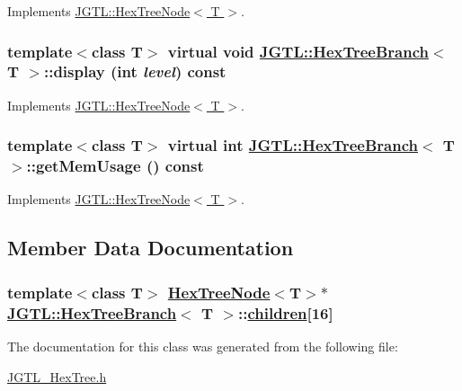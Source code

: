 Implements \hyperlink{class_j_g_t_l_1_1_hex_tree_node_a65570f2ecf17f3537a8a726795b4152}{JGTL::Hex\-Tree\-Node$<$ T $>$}.\hypertarget{class_j_g_t_l_1_1_hex_tree_branch_b9ca243a3f04629750ee65544b14e548}{
\subsubsection[display]{\setlength{\rightskip}{0pt plus 5cm}template$<$class T$>$ virtual void \hyperlink{class_j_g_t_l_1_1_hex_tree_branch}{JGTL::Hex\-Tree\-Branch}$<$ T $>$::display (int {\em level}) const}}
\label{class_j_g_t_l_1_1_hex_tree_branch_b9ca243a3f04629750ee65544b14e548}




Implements \hyperlink{class_j_g_t_l_1_1_hex_tree_node_2031e26f8fbf11d061e51cdd0a6c27eb}{JGTL::Hex\-Tree\-Node$<$ T $>$}.\hypertarget{class_j_g_t_l_1_1_hex_tree_branch_84bea1c135b12ec017dfa3c701d0f9c9}{
\subsubsection[getMemUsage]{\setlength{\rightskip}{0pt plus 5cm}template$<$class T$>$ virtual int \hyperlink{class_j_g_t_l_1_1_hex_tree_branch}{JGTL::Hex\-Tree\-Branch}$<$ T $>$::get\-Mem\-Usage () const}}
\label{class_j_g_t_l_1_1_hex_tree_branch_84bea1c135b12ec017dfa3c701d0f9c9}




Implements \hyperlink{class_j_g_t_l_1_1_hex_tree_node_9d71c1520ef1d80cf8ff292710e1994d}{JGTL::Hex\-Tree\-Node$<$ T $>$}.

\subsection{Member Data Documentation}
\hypertarget{class_j_g_t_l_1_1_hex_tree_branch_9917ee19fc32f342d487cb9d887887da}{
\subsubsection[children]{\setlength{\rightskip}{0pt plus 5cm}template$<$class T$>$ \hyperlink{class_j_g_t_l_1_1_hex_tree_node}{Hex\-Tree\-Node}$<$T$>$$\ast$ \hyperlink{class_j_g_t_l_1_1_hex_tree_branch}{JGTL::Hex\-Tree\-Branch}$<$ T $>$::\hyperlink{class_j_g_t_l_1_1_hex_tree_branch_9917ee19fc32f342d487cb9d887887da}{children}\mbox{[}16\mbox{]}}}
\label{class_j_g_t_l_1_1_hex_tree_branch_9917ee19fc32f342d487cb9d887887da}




The documentation for this class was generated from the following file:\begin{CompactItemize}
\item 
\hyperlink{_j_g_t_l___hex_tree_8h}{JGTL\_\-Hex\-Tree.h}\end{CompactItemize}
